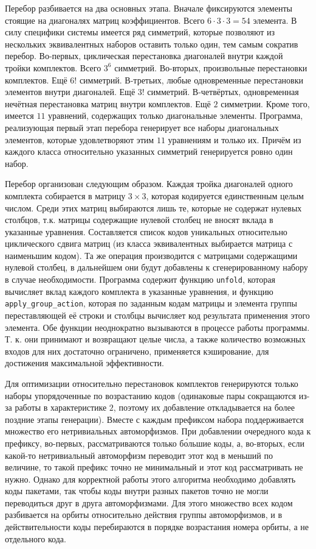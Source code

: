 \documentclass[12pt]{article}
\begin{document}
Перебор разбивается на два основных этапа. Вначале фиксируются элементы стоящие на диагоналях матриц коэффициентов. Всего $6 \cdot 3 \cdot 3 = 54$ элемента. В силу специфики системы имеется ряд симметрий, которые позволяют из нескольких эквивалентных наборов оставить только один, тем самым сократив перебор. Во-первых, циклическая перестановка диагоналей внутри каждой тройки комплектов. Всего $3^6$ симметрий. Во-вторых, произвольные перестановки комплектов. Ещё $6!$ симметрий. В-третьих, любые одновременные перестановки элементов внутри диагоналей. Ещё $3!$ симметрий. В-четвёртых, одновременная нечётная перестановка матриц внутри комплектов. Ещё $2$ симметрии. Кроме того, имеется $11$ уравнений, содержащих только диагональные элементы. Программа, реализующая первый этап перебора генерирует все наборы диагональных элементов, которые удовлетворяют этим $11$ уравнениям и только их. Причём из каждого класса относительно указанных симметрий генерируется ровно один набор.

Перебор организован следующим образом. Каждая тройка диагоналей одного комплекта собирается в матрицу $3 \times 3$, которая кодируется единственным целым числом. Среди этих матриц выбираются лишь те, которые не содержат нулевых столбцов, т.к. матрицы содержащие нулевой столбец не вносят вклада в указанные уравнения. Составляется список кодов уникальных относительно циклического сдвига матриц (из класса эквивалентных выбирается матрица с наименьшим кодом). Та же операция производится с матрицами содержащими нулевой столбец, в дальнейшем они будут добавлены к сгенерированному набору в случае необходимости. Программа содержит функцию \texttt{unfold}, которая вычисляет вклад каждого комплекта в указанные уравнения, и функцию \texttt{apply\_group\_action}, которая по заданным кодам матрицы и элемента группы переставляющей её строки и столбцы вычисляет код результата применения этого элемента. Обе функции неоднократно вызываются в процессе работы программы. Т. к. они принимают и возвращают целые числа, а также количество возможных входов для них достаточно ограничено, применяется кэширование, для достижения максимальной эффективности.

Для оптимизации относительно перестановок комплектов генерируются только наборы упорядоченные по возрастанию кодов (одинаковые пары сокращаются из-за работы в характеристике $2$, поэтому их добавление откладывается на более поздние этапы генерации). Вместе с каждым префиксом набора поддерживается множество его нетривиальных автоморфизмов. При добавлении очередного кода к префиксу, во-первых, рассматриваются только б\'{о}льшие коды, а, во-вторых, если какой-то нетривиальный автоморфизм переводит этот код в меньший по величине, то такой префикс точно не минимальный и этот код рассматривать не нужно. Однако для корректной работы этого алгоритма необходимо добавлять коды пакетами, так чтобы коды внутри разных пакетов точно не могли переводиться друг в друга автоморфизмами. Для этого множество всех кодом разбивается на орбиты относительно действия группы автоморфизмов, и в действительности коды перебираются в порядке возрастания номера орбиты, а не отдельного кода.
\end{document}

